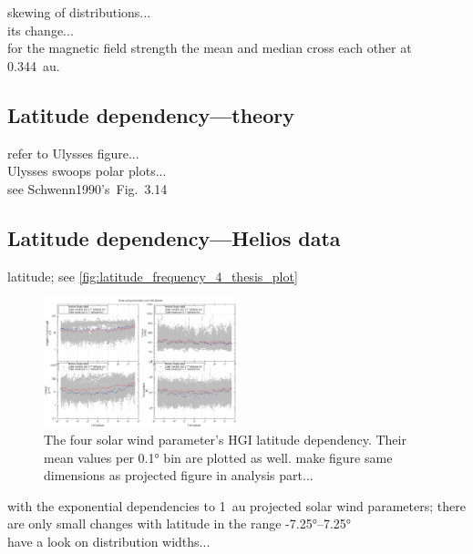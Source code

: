 skewing of distributions...\\
its change...\\
for the magnetic field strength the mean and median cross each other at 0.344~au.\\


\subsection{Latitude dependency---theory}

refer to Ulysses figure...\\
Ulysses swoops polar plots...\\
see Schwenn1990's~Fig.~3.14\\


\subsection{Latitude dependency---Helios data}

latitude; see \autoref{fig:latitude_frequency_4_thesis_plot}
\begin{figure}[htb]
	\centering
	\includegraphics[width=0.5\textwidth]{images/gnuplots/latitude_frequency_4_thesis_plot.png}
	\caption{The four solar wind parameter's HGI latitude dependency. Their mean values per 0.1° bin are plotted as well. make figure same dimensions as projected figure in analysis part...}
	\label{fig:latitude_frequency_4_thesis_plot}
\end{figure}

with the exponential dependencies to 1~au projected solar wind parameters; there are only small changes with latitude in the range -7.25°--7.25°\\
have a look on distribution widths...\\

